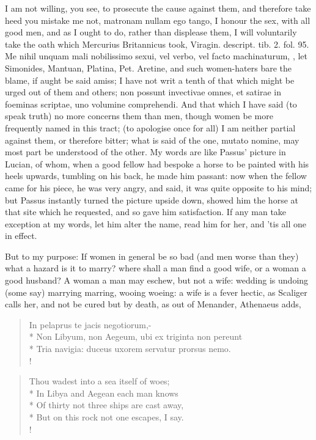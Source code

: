 I am not willing, you see, to prosecute the cause against them, and
therefore take heed you mistake me not, matronam nullam ego
tango, I honour the sex, with all good men, and as I ought to do,
rather than displease them, I will voluntarily take the oath which
Mercurius Britannicus took, Viragin. descript. tib. 2. fol. 95. Me
nihil unquam mali nobilissimo sexui, vel verbo, vel facto machinaturum,
\etc{}, let Simonides, Mantuan, Platina, Pet. Aretine, and such
women-haters bare the blame, if aught be said amiss; I have not writ a
tenth of that which might be urged out of them and others; non
possunt invectivae omnes, et satirae in foeminas scriptae, uno volumine
comprehendi. And that which I have said (to speak truth) no more
concerns them than men, though women be more frequently named in this
tract; (to apologise once for all) I am neither partial against them,
or therefore bitter; what is said of the one, mutato nomine, may most
part be understood of the other. My words are like Passus' picture in
Lucian, of whom, when a good fellow had bespoke a horse to be
painted with his heels upwards, tumbling on his back, he made him
passant: now when the fellow came for his piece, he was very angry, and
said, it was quite opposite to his mind; but Passus instantly turned
the picture upside down, showed him the horse at that site which he
requested, and so gave him satisfaction. If any man take exception at
my words, let him alter the name, read him for her, and 'tis all one in
effect.

But to my purpose: If women in general be so bad (and men worse than
they) what a hazard is it to marry? where shall a man find a good wife,
or a woman a good husband? A woman a man may eschew, but not a wife:
wedding is undoing (some say) marrying marring, wooing woeing: a
wife is a fever hectic, as Scaliger calls her, and not be cured but by
death, as out of Menander, Athenaeus adds,
%
\begin{latin}
\begin{verse}%
In pelaprus te jacis negotiorum,-\\*
Non Libyum, non Aegeum, ubi ex triginta non pereunt\\*
Tria navigia: duceus uxorem servatur prorsus nemo.\\!
\end{verse}%
\end{latin}
\translationrule%
\begin{verse}%
Thou wadest into a sea itself of woes;\\*
In Libya and Aegean each man knows\\*
Of thirty not three ships are cast away,\\*
But on this rock not one escapes, I say.\\!
\end{verse}%

